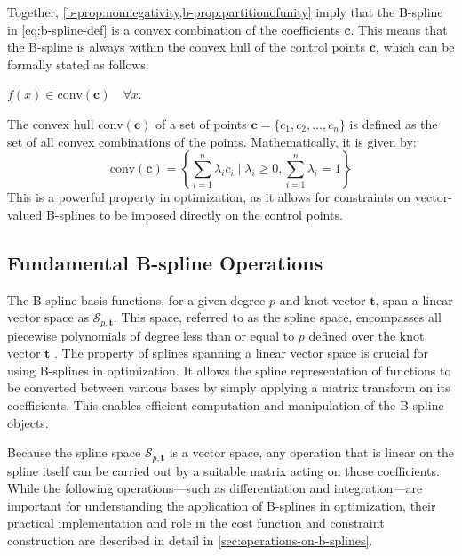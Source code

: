 Together, \cref{b-prop:nonnegativity,b-prop:partitionofunity} imply that the B-spline in \cref{eq:b-spline-def} is a convex combination of the coefficients $\mathbf c$. This means that the B-spline is always within the convex hull of the control points $\mathbf c$, which can be formally stated as follows:
\begin{property}\label{b-prop:convexhull}
    $f(x) \in \text{conv}(\mathbf{c})
    \quad\forall x$.
\end{property}

The convex hull $\text{conv}(\mathbf{c})$ of a set of points $\mathbf{c} = \{c_1, c_2, \ldots, c_n\}$ is defined as the set of all convex combinations of the points. Mathematically, it is given by:
\begin{equation}
    \text{conv}(\mathbf{c}) = \left\{ \sum_{i=1}^n \lambda_i c_i \mid \lambda_i \geq 0, \sum_{i=1}^n \lambda_i = 1 \right\}
\end{equation}
This is a powerful property in optimization, as it allows for constraints on vector-valued B-splines to be imposed directly on the control points.


\subsection{Fundamental B-spline Operations}
\label{sec:b-spline-operations-theory}
The B-spline basis functions, for a given degree $p$ and knot vector $\mathbf{t}$, span a linear vector space  as $\mathcal{S}_{p, \mathbf{t}}$. This space, referred to as the spline space, encompasses all piecewise polynomials of degree less than or equal to $p$ defined over the knot vector $\mathbf{t}$ \citep{Grimstad2016}. The property of splines spanning a linear vector space is crucial for using B-splines in optimization. 
It allows the spline representation of functions to be converted between various bases by simply applying a matrix transform on its coefficients. This enables efficient computation and manipulation of the B-spline objects.

Because the spline space $\mathcal{S}_{p,\mathbf{t}}$ is a vector space, any operation that is linear on the spline itself can be carried out by a suitable matrix acting on those coefficients.  While the following operations---such as differentiation and integration---are important for understanding the application of B-splines in optimization, their practical implementation and role in the cost function and constraint construction are described in detail in \cref{sec:operations-on-b-splines}.

